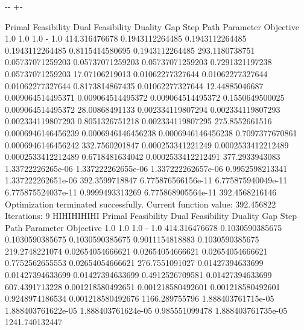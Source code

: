 \documentclass[letterpaper,10pt,english]{sphinxmanual}
\newlength\nbsphinxcodecellspacing
\begin{document}
{

\kern-\sphinxverbatimsmallskipamount\kern-\baselineskip
\kern+\FrameHeightAdjust\kern-\fboxrule
\vspace{\nbsphinxcodecellspacing}

\begin{sphinxVerbatim}[commandchars=\\\{\}]
Primal Feasibility  Dual Feasibility    Duality Gap         Step             Path Parameter      Objective
1.0                 1.0                 1.0                 -                1.0                 414.316476678
0.1943112264485     0.1943112264485     0.1943112264485     0.8115414580695  0.1943112264485     293.1180738751
0.05737071259203    0.05737071259203    0.05737071259203    0.7291321197238  0.05737071259203    17.07106219013
0.01062277327644    0.01062277327644    0.01062277327644    0.8173814867435  0.01062277327644    12.44885046687
0.009064514495371   0.009064514495372   0.009064514495372   0.1550649500025  0.009064514495372   28.00868491133
0.002334119807294   0.002334119807293   0.002334119807293   0.8051326751218  0.002334119807295   275.8552661516
0.0006946146456239  0.0006946146456238  0.0006946146456238  0.7097377670861  0.0006946146456242  332.7560201847
0.000253341221249   0.0002533412212489  0.0002533412212489  0.6718481634042  0.0002533412212491  377.2933943083
1.33722226265e-06   1.337222262655e-06  1.337222262657e-06  0.9952598213341  1.337222262651e-06  392.3599718847
6.775876566156e-11  6.775875940049e-11  6.775875524037e-11  0.9999493313269  6.775868905564e-11  392.4568216146
Optimization terminated successfully.
         Current function value: 392.456822
         Iterations: 9
HIHIHIHIHI
Primal Feasibility  Dual Feasibility    Duality Gap         Step             Path Parameter      Objective
1.0                 1.0                 1.0                 -                1.0                 414.316476678
0.1030590385675     0.1030590385675     0.1030590385675     0.9011154818883  0.1030590385675     219.2748221074
0.02654054666621    0.02654054666621    0.02654054666621    0.7752562655553  0.02654054666621    276.7551091027
0.01427394633699    0.01427394633699    0.01427394633699    0.4912526709581  0.01427394633699    607.4391713228
0.001218580492651   0.001218580492601   0.001218580492601   0.9248974186534  0.001218580492676   1166.289755796
1.888403761715e-05  1.888403761622e-05  1.888403761624e-05  0.985551099478   1.888403761735e-05  1241.740132447

\end{sphinxVerbatim}}
\end{document}
